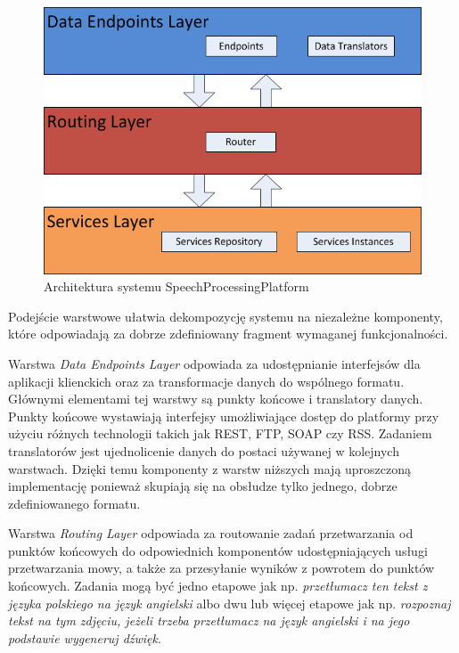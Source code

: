 \begin{figure}[!h]
	\centering
	\includegraphics[scale=0.7]{layered_architecture.png}
	\caption{Architektura systemu SpeechProcessingPlatform}\label{fig:layered_architecture}
\end{figure}

Podejście warstwowe ułatwia dekompozycję systemu na niezależne komponenty, które odpowiadają za dobrze zdefiniowany fragment wymaganej funkcjonalności. 

Warstwa \textit{Data Endpoints Layer} odpowiada za udostępnianie interfejsów dla aplikacji klienckich oraz za transformacje danych do wspólnego formatu. Głównymi elementami tej warstwy są punkty końcowe i translatory danych. Punkty końcowe wystawiają interfejsy umożliwiające dostęp do platformy przy użyciu różnych technologii takich jak REST, FTP, SOAP czy RSS. Zadaniem translatorów jest ujednolicenie danych do postaci używanej w kolejnych warstwach. Dzięki temu komponenty z warstw niższych mają uproszczoną implementację ponieważ skupiają się na obsłudze tylko jednego, dobrze zdefiniowanego formatu. 

Warstwa \textit{Routing Layer} odpowiada za routowanie zadań przetwarzania od punktów końcowych do odpowiednich komponentów udostępniających usługi przetwarzania mowy, a także za przesyłanie wyników z powrotem do punktów końcowych. Zadania mogą być jedno etapowe jak np. \textit{przetłumacz ten tekst z języka polskiego na język angielski} albo dwu lub więcej etapowe jak np. \textit{rozpoznaj tekst na tym zdjęciu, jeżeli trzeba przetłumacz na język angielski i na jego podstawie wygeneruj dźwięk}.

